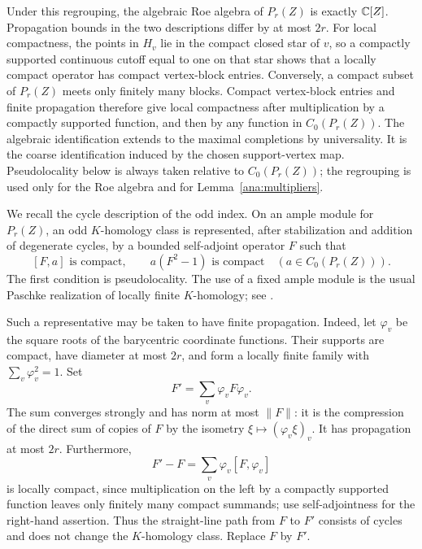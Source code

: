 Under this regrouping, the algebraic Roe algebra of $P_r(Z)$ is exactly
$\mathbb C[Z]$.  Propagation bounds in the two descriptions differ by at most
$2r$.  For local compactness, the points in $H_v$ lie in the compact
closed star of $v$, so a compactly supported continuous cutoff equal to
one on that star shows that a locally compact operator has compact
vertex-block entries.  Conversely, a compact subset of $P_r(Z)$ meets
only finitely many blocks.  Compact vertex-block entries and finite
propagation therefore give local compactness after multiplication by a
compactly supported function, and then by any function in $C_0(P_r(Z))$.
The algebraic identification extends to the maximal completions by
universality.  It is the coarse identification induced by the chosen
support-vertex map.  Pseudolocality below is always taken relative to
$C_0(P_r(Z))$; the regrouping is used only for the Roe algebra and for
Lemma~\ref{ana:multipliers}.

We recall the cycle description of the odd index.  On an ample module
for $P_r(Z)$, an odd $K$-homology class is represented, after stabilization
and addition of degenerate cycles, by a bounded self-adjoint operator
$F$ such that
\[
 [F,a]\text{ is compact},\qquad a(F^2-1)\text{ is compact}
 \quad(a\in C_0(P_r(Z))).
\]
The first condition is pseudolocality.  The use of a fixed ample module
is the usual Paschke realization of locally finite $K$-homology; see
\cite{HigsonRoe00}.

Such a representative may be taken to have finite propagation.  Indeed,
let $\varphi_v$ be the square roots of the barycentric coordinate
functions.  Their supports are compact, have diameter at most $2r$,
and form a locally finite family with $\sum_v\varphi_v^2=1$.  Set
\[
 F'=\sum_v\varphi_vF\varphi_v.
\]
The sum converges strongly and has norm at most $\|F\|$: it is the
compression of the direct sum of copies of $F$ by the isometry
$\xi\mapsto(\varphi_v\xi)_v$.  It has propagation at most $2r$.
Furthermore,
\[
 F'-F=\sum_v\varphi_v[F,\varphi_v]
\]
is locally compact, since multiplication on the left by a compactly
supported function leaves only finitely many compact summands; use
self-adjointness for the right-hand assertion.  Thus the straight-line
path from $F$ to $F'$ consists of cycles and does not change the
$K$-homology class.  Replace $F$ by $F'$.

